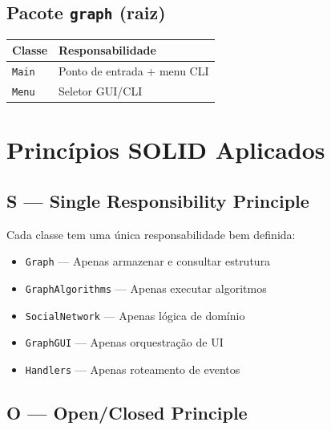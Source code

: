 \documentclass[12pt,a4paper]{article}
\begin{document}
    \subsection{Pacote \texttt{graph} (raiz)}

    \begin{table}[h]
        \centering
        \begin{tabular}{|l|l|}
            \hline
            \textbf{Classe} & \textbf{Responsabilidade} \\
            \hline
            \texttt{Main} & Ponto de entrada + menu CLI \\
            \hline
            \texttt{Menu} & Seletor GUI/CLI \\
            \hline
        \end{tabular}
    \end{table}

    \newpage

    \section{Princípios SOLID Aplicados}

    \subsection{S — Single Responsibility Principle}

    Cada classe tem uma única responsabilidade bem definida:

    \begin{itemize}
        \item \texttt{Graph} — Apenas armazenar e consultar estrutura
        \item \texttt{GraphAlgorithms} — Apenas executar algoritmos
        \item \texttt{SocialNetwork} — Apenas lógica de domínio
        \item \texttt{GraphGUI} — Apenas orquestração de UI
        \item \texttt{Handlers} — Apenas roteamento de eventos
    \end{itemize}

    \subsection{O — Open/Closed Principle}
\end{document}
